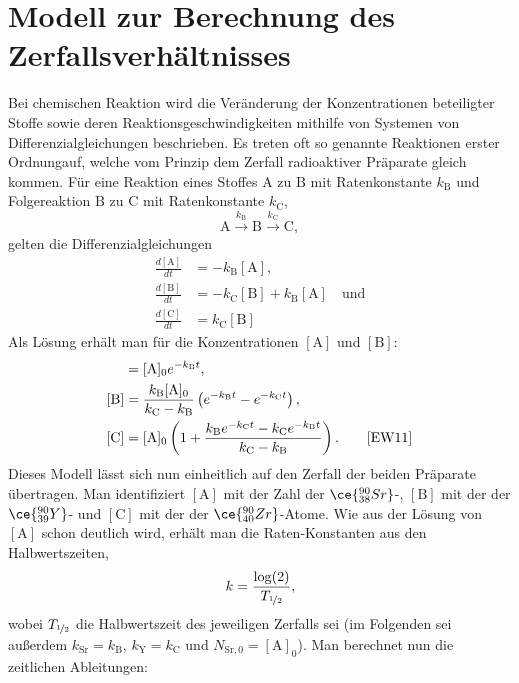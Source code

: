 \section{Modell zur Berechnung des Zerfallsverhältnisses}
Bei chemischen Reaktion wird die Veränderung der Konzentrationen beteiligter Stoffe sowie deren Reaktionsgeschwindigkeiten mithilfe von Systemen von Differenzialgleichungen beschrieben. Es treten oft so genannte Reaktionen \glqq erster Ordnung\grqq auf, welche vom Prinzip dem Zerfall radioaktiver Präparate gleich kommen. Für eine Reaktion eines Stoffes $\mathrm A$ zu $\mathrm B$ mit Ratenkonstante $k_\mathrm B$ und Folgereaktion $\mathrm B$ zu $\mathrm C$ mit Ratenkonstante $k_\mathrm C$,
\begin{equation}
\mathrm{A} \xrightarrow{k_{\mathrm{B}}} \mathrm{B} \xrightarrow{k_{\mathrm{C}}} \mathrm{C},
\end{equation}
gelten die Differenzialgleichungen
\begin{align}
\frac{d[\mathrm A]}{dt} &= -k_{\mathrm{B}} [\mathrm A],\\
\frac{d[\mathrm B]}{dt} &= -k_{\mathrm{C}} [\mathrm B] + k_{\mathrm{B}} [\mathrm A]\quad\text{und}\nonumber\\
\frac{d[\mathrm C]}{dt} &= k_{\mathrm{C}} [\mathrm B] \nonumber
\end{align}
Als Lösung erhält man für die Konzentrationen $[\mathrm A]$ und $[\mathrm B]$:
\begin{align}
[\mathrm A] &= [\mathrm A]_0 e^{-k_{\mathrm{B}} t},\\
[\mathrm B] &= \frac{k_{\mathrm{B}} [\mathrm A]_0}{k_{\mathrm{C}} - k_{\mathrm{B}}} \left(e^{-k_{\mathrm{B}} t} - e^{-k_{\mathrm{C}} t}\right),\nonumber\\
[\mathrm C] &= [\mathrm A]_0 \left( 1 + \frac{k_{\mathrm{B}} e^{-k_{\mathrm{C}} t} - k_{\mathrm{C}} e^{-k_{\mathrm{B}} t}}{k_{\mathrm{C}} - k_{\mathrm{B}}} \right).\qquad\cite{EW11}\nonumber
\end{align}
Dieses Modell lässt sich nun einheitlich auf den Zerfall der beiden Präparate übertragen. Man identifiziert $[\mathrm A]$ mit der Zahl der $\ce{_{38}^{90} Sr}$-, $[\mathrm B]$ mit der der $\ce{_{39}^{90} Y}$- und $[\mathrm C]$ mit der der $\ce{_{40}^{90} Zr}$-Atome. Wie aus der Lösung von $[\mathrm A]$ schon deutlich wird, erhält man die Raten-Konstanten aus den Halbwertszeiten,
\begin{equation}
k = \frac{\log(2)}{T_{\nicefrac{1}{2}}}\label{eq:iii_3_umrechnung},
\end{equation}
wobei $T_{\nicefrac{1}{2}}$ die Halbwertszeit des jeweiligen Zerfalls sei (im Folgenden sei außerdem $k_{\mathrm{Sr}} = k_{\mathrm{B}}$, $k_{\mathrm{Y}} = k_{\mathrm{C}}$ und $N_{\mathrm{Sr},0} = [\mathrm A]_0$). Man berechnet nun die zeitlichen Ableitungen:
